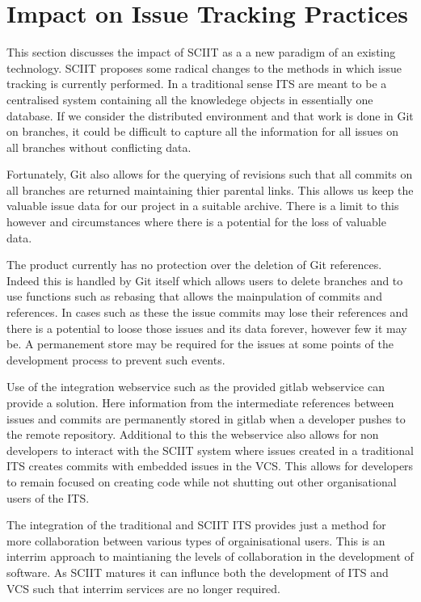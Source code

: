\documentclass{mproj}
\begin{document}
\section{Impact on Issue Tracking Practices}

This section discusses the impact of SCIIT as a a new paradigm of an existing technology. SCIIT proposes some radical changes to the methods in which issue tracking is currently performed. In a traditional sense ITS are meant to be a centralised system containing all the knowledege objects in essentially one database. If we consider the distributed environment and that work is done in Git on branches, it could be difficult to capture all the information for all issues on all branches without conflicting data. 

Fortunately, Git also allows for the querying of revisions such that all commits on all branches are returned maintaining thier parental links. This allows us keep the valuable issue data for our project in a suitable archive. There is a limit to this however and circumstances where there is a potential for the loss of valuable data.

The product currently has no protection over the deletion of Git references. Indeed this is handled by Git itself which allows users to delete branches and to use functions such as rebasing that allows the mainpulation of commits and references. In cases such as these the issue commits may lose their references and there is a potential to loose those issues and its data forever, however few it may be. A permanement store may be required for the issues at some points of the development process to prevent such events.

Use of the integration webservice such as the provided gitlab webservice can provide a solution. Here information from the intermediate references between issues and commits are permanently stored in gitlab when a developer pushes to the remote repository. Additional to this the webservice also allows for non developers to interact with the SCIIT system where issues created in a traditional ITS creates commits with embedded issues in the VCS. This allows for developers to remain focused on creating code while not shutting out other organisational users of the ITS.

The integration of the traditional and SCIIT ITS provides just a method for more collaboration between various types of orgainisational users. This is an interrim approach to maintianing the levels of collaboration in the development of software. As SCIIT matures it can influnce both the development of ITS and VCS such that interrim services are no longer required.
\end{document}
